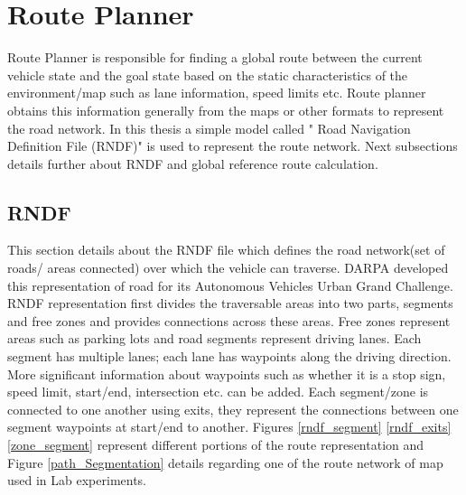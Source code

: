 \section{Route Planner} \label{route_planner}
Route Planner is responsible for finding a global route between the current vehicle state and the goal state based on the static characteristics of the environment/map such as lane information, speed limits etc. Route planner obtains this information generally from the maps or other formats to represent the road network. In this thesis a simple model called " Road Navigation Definition File (RNDF)"  \cite{rndf_darpa} \cite{rndf_fu} is used to represent the route network. Next subsections details further about RNDF and global reference route calculation.

\subsection{RNDF}

This section details about the RNDF file \cite{rndf_darpa} which defines the road network(set of roads/ areas connected) over which the vehicle can traverse. DARPA developed this representation of road for its Autonomous Vehicles Urban Grand Challenge. RNDF representation first divides the traversable areas into two parts, segments and free zones and provides connections across these areas. Free zones represent areas such as parking lots and road segments represent driving lanes. Each segment has multiple lanes; each lane has waypoints along the driving direction. More significant information about waypoints such as whether it is a stop sign, speed limit, start/end, intersection etc. can be added. Each segment/zone is connected to one another using exits, they represent the connections between one segment waypoints at start/end to another. Figures \ref{rndf_segment} \ref{rndf_exits} \ref{zone_segment} \cite{rndf_darpa} represent different portions of the route representation and Figure \ref{path_Segmentation} details regarding one of the route network of map used in Lab experiments. 





